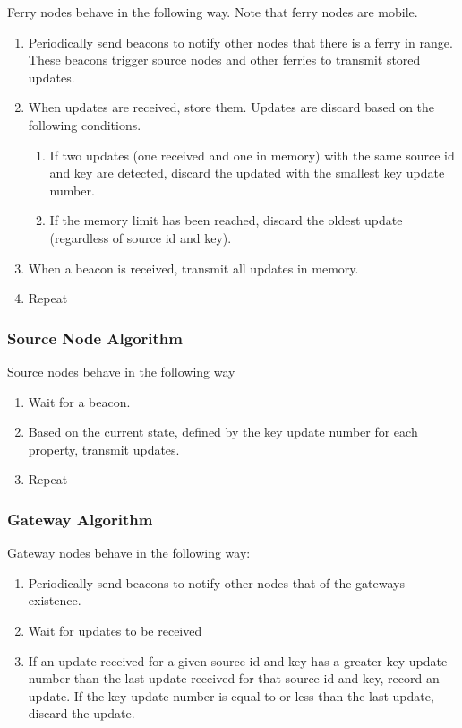 Ferry nodes behave in the following way. Note that ferry nodes are mobile.

\begin{enumerate}
\item Periodically send beacons to notify other nodes that there is a ferry in range.
These beacons trigger source nodes and other ferries to transmit stored updates.
\item When updates are received, store them.
Updates are discard based on the following conditions.
	\begin{enumerate}
	\item If two updates (one received and one in memory) with the same source id and key are detected, discard the updated with the smallest key update number.
	\item If the memory limit has been reached, discard the oldest update (regardless of source id and key).
	\end{enumerate}
\item When a beacon is received, transmit all updates in memory.
\item Repeat
\end{enumerate}

\subsubsection{Source Node Algorithm}

Source nodes behave in the following way

\begin{enumerate}
\item Wait for a beacon.
\item Based on the current state, defined by the key update number for each property, transmit updates.
\item Repeat
\end{enumerate}

\subsubsection{Gateway Algorithm}

Gateway nodes behave in the following way:

\begin{enumerate}
\item Periodically send beacons to notify other nodes that of the gateways existence.
\item Wait for updates to be received
\item If an update received for a given source id and key has a greater key update number than the last update received for that source id and key, record an update.
If the key update number is equal to or less than the last update, discard the update.
\end{enumerate}

